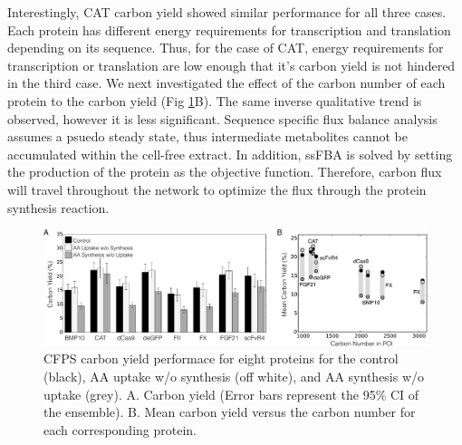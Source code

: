 \documentclass[journal=asbcd6,manuscript=article]{achemso}
\begin{document}
Interestingly, CAT carbon yield showed similar performance for all three cases. 
Each protein has different energy requirements for transcription and translation depending on its sequence.
Thus, for the case of CAT, energy requirements for transcription or translation are low enough that it's carbon yield is not hindered in the third case.
We next investigated the effect of the carbon number of each protein to the carbon yield (Fig \ref{fig:Yield_POI}B). 
The same inverse qualitative trend is observed, however it is less significant. 
Sequence specific flux balance analysis assumes a psuedo steady state, thus intermediate metabolites cannot be accumulated within the cell-free extract.
In addition, ssFBA is solved by setting the production of the protein as the objective function.
Therefore, carbon flux will travel throughout the network to optimize the flux through the protein synthesis reaction. 
\begin{figure}[t!]
\centering
\includegraphics[width=1.00\textwidth]{./Figures/Yield_POI.pdf}
\caption{CFPS carbon yield performace for eight proteins for the control (black), AA uptake w/o synthesis (off white), and AA synthesis w/o uptake (grey). A. Carbon yield (Error bars represent the 95\% CI of the ensemble). B. Mean carbon yield versus the carbon number for each corresponding protein.}
\label{fig:Yield_POI}
\end{figure}
\end{document}
